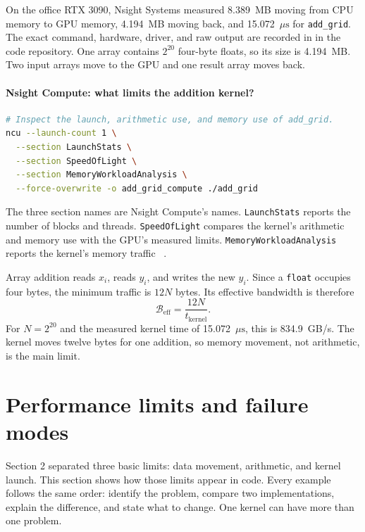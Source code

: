 \documentclass[11pt]{article}
\numberwithin{equation}{section}
\numberwithin{figure}{section}
\numberwithin{table}{section}
\newcommand{\code}[1]{\texttt{#1}}
\begin{document}
On the office RTX 3090, Nsight Systems measured 8.389~MB moving from CPU memory to
GPU memory, 4.194~MB moving back, and 15.072~\(\mu\mathrm{s}\) for
\code{add\_grid}.  The exact command, hardware, driver, and raw output are recorded
in  in the code repository.
One array contains \(2^{20}\) four-byte floats, so its size is 4.194~MB.  Two input
arrays move to the GPU and one result array moves back.

\paragraph{Nsight Compute: what limits the addition kernel?}
\begin{lstlisting}[language=bash,numbers=none]
# Inspect the launch, arithmetic use, and memory use of add_grid.
ncu --launch-count 1 \
  --section LaunchStats \
  --section SpeedOfLight \
  --section MemoryWorkloadAnalysis \
  --force-overwrite -o add_grid_compute ./add_grid
\end{lstlisting}
The three section names are Nsight Compute's names.  \code{LaunchStats} reports the
number of blocks and threads.  \code{SpeedOfLight} compares the kernel's arithmetic
and memory use with the GPU's measured limits.
\code{MemoryWorkloadAnalysis} reports the kernel's memory traffic
~\cite{nsightcompute2026,nsightcompute-profiling}.

Array addition reads \(x_i\), reads \(y_i\), and writes the new \(y_i\).  Since a
\code{float} occupies four bytes, the minimum traffic is \(12N\) bytes.  Its
effective bandwidth is therefore
\begin{equation}
  \mathcal{B}_{\mathrm{eff}}
  =\frac{12N}{t_{\mathrm{kernel}}}.
  \label{eq:effective-bandwidth}
\end{equation}
For \(N=2^{20}\) and the measured kernel time of 15.072~\(\mu\mathrm{s}\), this is
834.9~GB/s.  The kernel moves twelve bytes for one addition, so memory movement,
not arithmetic, is the main limit.
\newpage
\section{Performance limits and failure modes}
\label{sec:gpu-underutilization}

Section 2 separated three basic limits: data movement, arithmetic, and kernel
launch.  This section shows how those limits appear in code.  Every example follows
the same order: identify the problem, compare two implementations, explain the
difference, and state what to change.  One kernel can have more than one problem.
\end{document}
